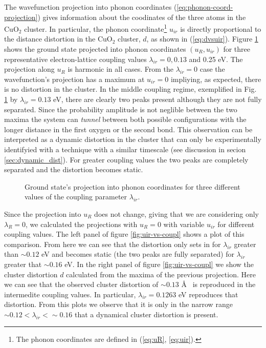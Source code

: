 The wavefunction projection into phonon coordinates (\ref{eq:phonon-coord-projection}) gives information about the coodinates of the three atoms in the CuO$_2$ cluster.
In particular, the phonon coordinate\footnote{The phonon coordinates are  defined in (\ref{eq:uR}, \ref{eq:uir}).} $u_{ir}$ is directly proportional to the distance distortion in the CuO$_2$ cluster, $d$, as shown in (\ref{eq:dvsuir}).
Figure \ref{fig:phononProjGrd} shows the ground state projected into phonon coordinates $(u_R,u_{ir})$ for three representative electron-lattice coupling values $\lambda_{ir}=0, 0.13$ and 0.25 eV.
The projection along $u_R$ is harmonic in all cases.
From the $\lambda_{ir}=0$ case the wavefunction's projection has a maximum at $u_{ir}=0$ impliying, as expected, there is no distortion in the cluster.
In the middle coupling regime, exemplified in Fig. \ref{fig:phononProjGrd} by $\lambda_{ir}=0.13$ eV, there are clearly two peaks present although they are not fully separated.
Since the probability amplitude is not neglible between the two maxima the system can \textit{tunnel} between both possible configurations with the longer distance in the first oxygen or the second bond.
This observation can be interpreted as a dynamic distortion in the cluster that can only be experimentally identifyied with a technique with a similar timescale (see discussion in secion \ref{sec:dynamic_dist}). 
For greater coupling values the two peaks are completely separated and the distortion becomes static.

\begin{figure}[ht]
  \centering
  
  \caption{Ground state's projection into phonon coordinates for three different values of the coupling parameter $\lambda_{ir}$.}
  \label{fig:phononProjGrd}
\end{figure}

Since the projection into $u_R$ does not change, giving that we are considering only $\lambda_R=0$, we calculated the projections with $u_R=0$ with variable $u_{ir}$ for different coupling values.
The left panel of figure \ref{fig:uir-vs-coupl} shows a plot of this comparison.
From here we can see that the distortion only sets in for $\lambda_{ir}$ greater than $\sim 0.12$ eV and becomes static (the two peaks are fully separated) for $\lambda_{ir}$ greater that $\sim 0.16$ eV.
In the right panel of figure \ref{fig:uir-vs-coupl} we show the cluster distortion $d$ calculated from the maxima of the previous projection.
Here we can see that the observed cluster distortion of $\sim 0.13$ \AA\ \cite{MustredeLeon1990} is reproduced in the intermedite coupling values. 
In particular, $\lambda_{ir}=0.1263$ eV reproduces that distortion.
From this plots we observe that it is only in the narrow range  $\sim 0.12 < \lambda_{ir} < \sim 0.16$ that a dynamical cluster distortion is present. 

